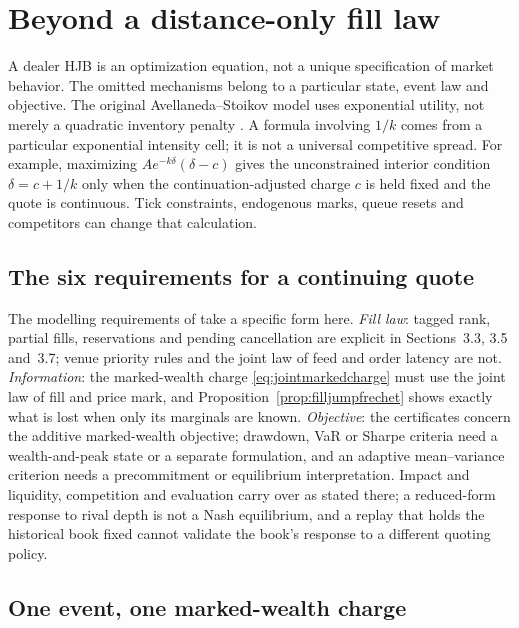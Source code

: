 \section{Beyond a distance-only fill law}
\label{sec:realisticquoting}

A dealer HJB is an optimization equation, not a unique specification of
market behavior. The omitted mechanisms belong to a particular state,
event law and objective. The original Avellaneda--Stoikov model uses
exponential utility, not merely a quadratic inventory penalty
\citep{AvellanedaStoikov2008}. A formula involving \(1/k\) comes from a
particular exponential intensity cell; it is not a universal competitive
spread. For example, maximizing
\(Ae^{-k\delta}(\delta-c)\) gives the unconstrained interior condition
\(\delta=c+1/k\) only when the continuation-adjusted charge \(c\) is held
fixed and the quote is continuous. Tick constraints, endogenous marks,
queue resets and competitors can change that calculation.

\subsection{The six requirements for a continuing quote}
The modelling requirements of \citet[Section~37.1]{NoguerAlonso2026Execution} take a
specific form here. \emph{Fill law}: tagged rank, partial fills, reservations
and pending cancellation are explicit in Sections~3.3, 3.5 and~3.7; venue
priority rules and the joint law of feed and order latency are not.
\emph{Information}: the marked-wealth charge \eqref{eq:jointmarkedcharge} must use the joint law of fill
and price mark, and Proposition~\ref{prop:filljumpfrechet} shows exactly what
is lost when only its marginals are known. \emph{Objective}: the certificates
concern the additive marked-wealth objective; drawdown, VaR or Sharpe criteria
need a wealth-and-peak state or a separate formulation, and an adaptive
mean--variance criterion needs a precommitment or equilibrium interpretation.
Impact and liquidity, competition and evaluation carry over as stated there; a
reduced-form response to rival depth is not a Nash equilibrium, and a replay
that holds the historical book fixed cannot validate the book's response to a
different quoting policy.

\subsection{One event, one marked-wealth charge}

